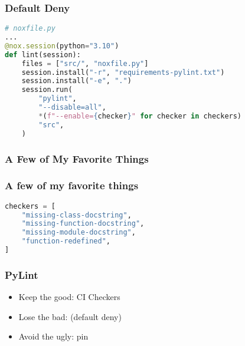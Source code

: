 \begin{frame}[fragile]
\frametitle{Default Deny}

\begin{lstlisting}[language=Python]
# noxfile.py
...
@nox.session(python="3.10")
def lint(session):
    files = ["src/", "noxfile.py"]
    session.install("-r", "requirements-pylint.txt")
    session.install("-e", ".")
    session.run(
        "pylint",
        "--disable=all",
        *(f"--enable={checker}" for checker in checkers)
        "src",
    )
\end{lstlisting}

\end{frame}

\hypertarget{a-few-of-my-favorite-things}{%
\subsubsection{A Few of My Favorite
Things}\label{a-few-of-my-favorite-things}}

\begin{frame}[fragile]
\frametitle{A few of my favorite things}

\begin{lstlisting}[language=Python]
checkers = [
    "missing-class-docstring",
    "missing-function-docstring",
    "missing-module-docstring",
    "function-redefined",
]
\end{lstlisting}

\end{frame}

\begin{frame}
\frametitle{PyLint}

\begin{itemize}
\item Keep the good: \pause
      CI \pause
      Checkers \pause
\item Lose the bad:
      \pause (default deny)
      \pause
\item Avoid the ugly: \pause
      pin
\end{itemize}

\end{frame}


